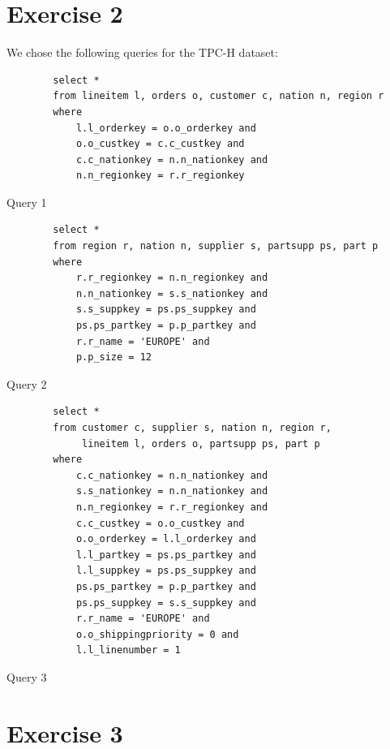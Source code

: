 \documentclass{scrartcl}
\begin{document}
\section*{Exercise 2}

We chose the following queries for the TPC-H dataset:

\begin{listing}[H]
    \begin{verbatim}
        select *
        from lineitem l, orders o, customer c, nation n, region r
        where
            l.l_orderkey = o.o_orderkey and
            o.o_custkey = c.c_custkey and
            c.c_nationkey = n.n_nationkey and
            n.n_regionkey = r.r_regionkey
    \end{verbatim}
    \caption{Query 1}
\end{listing}

\begin{listing}[H]
    \begin{verbatim}
        select *
        from region r, nation n, supplier s, partsupp ps, part p
        where
            r.r_regionkey = n.n_regionkey and
            n.n_nationkey = s.s_nationkey and
            s.s_suppkey = ps.ps_suppkey and
            ps.ps_partkey = p.p_partkey and
            r.r_name = 'EUROPE' and
            p.p_size = 12
    \end{verbatim}
    \caption{Query 2}
\end{listing}

\begin{listing}[H]
    \begin{verbatim}
        select *
        from customer c, supplier s, nation n, region r,
             lineitem l, orders o, partsupp ps, part p
        where
            c.c_nationkey = n.n_nationkey and
            s.s_nationkey = n.n_nationkey and
            n.n_regionkey = r.r_regionkey and
            c.c_custkey = o.o_custkey and
            o.o_orderkey = l.l_orderkey and
            l.l_partkey = ps.ps_partkey and
            l.l_suppkey = ps.ps_suppkey and
            ps.ps_partkey = p.p_partkey and
            ps.ps_suppkey = s.s_suppkey and
            r.r_name = 'EUROPE' and
            o.o_shippingpriority = 0 and
            l.l_linenumber = 1
    \end{verbatim}
    \caption{Query 3}
\end{listing}

\section*{Exercise 3}
\end{document}
